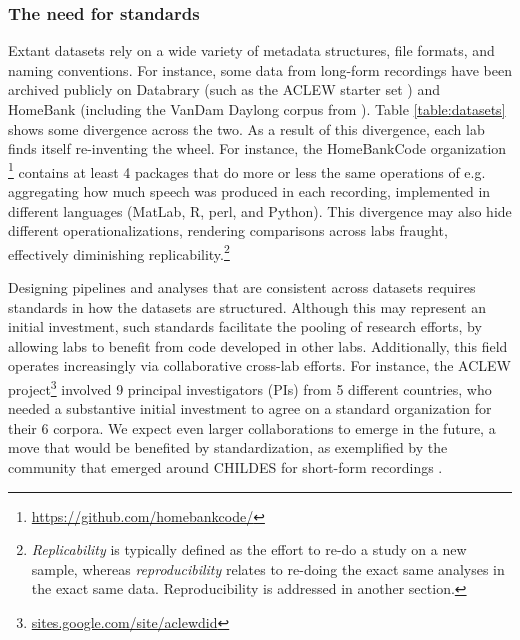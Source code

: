 \documentclass[smallextended]{svjour3}       %
\begin{document}
\subsubsection*{The need for standards}

Extant datasets rely on a wide variety of metadata structures, file formats, and naming conventions. For instance, some data from long-form recordings have been archived publicly on Databrary (such as the ACLEW starter set \citep{starter}) and HomeBank (including the VanDam Daylong corpus from \citealt{vandam-day}). Table \ref{table:datasets} shows some divergence across the two. As a result of this divergence, each lab finds itself re-inventing the wheel. For instance, the HomeBankCode organization \footnote{\url{https://github.com/homebankcode/}} contains at least 4 packages that do more or less the same operations of e.g. aggregating how much speech was produced in each recording, implemented in different languages (MatLab,  R, perl, and Python). This divergence may also hide different operationalizations, rendering comparisons across labs fraught, effectively diminishing replicability.\footnote{\textit{Replicability} is typically defined as the effort to re-do a study on a new sample, whereas \textit{reproducibility} relates to re-doing the exact same analyses in the exact same data. Reproducibility is addressed in another section.} 

Designing pipelines and analyses that are consistent across datasets requires standards in how the datasets are structured. Although this may represent an initial investment, such standards facilitate the pooling of research efforts, by allowing labs to benefit from code developed in other labs. Additionally, this field operates increasingly via collaborative cross-lab efforts. For instance, the ACLEW project\footnote{\url{sites.google.com/site/aclewdid}} involved 9 principal investigators (PIs) from 5 different countries, who needed a substantive initial investment to agree on a standard organization for their 6 corpora. We expect even larger collaborations to emerge in the future, a move that would be benefited by standardization, as exemplified by the community that emerged around CHILDES for short-form recordings \citep{macwhinney2000childes}.
\end{document}
